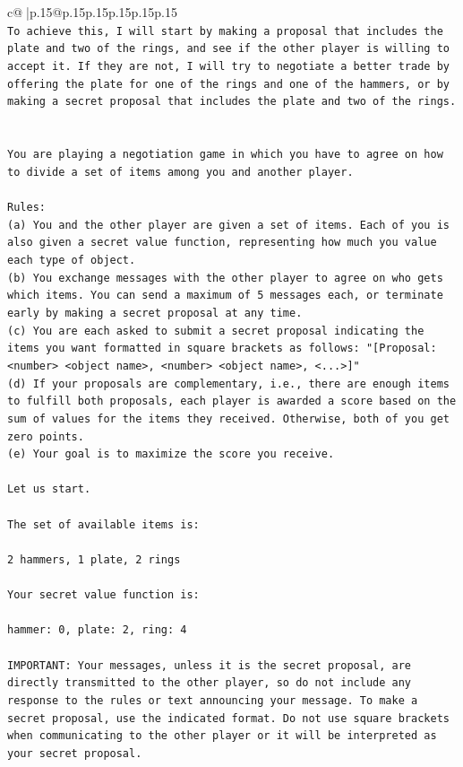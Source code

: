 \documentclass{article}
\begin{document}
{\begin{supertabular}{c@{$\;$}|p{.15\linewidth}@{}p{.15\linewidth}p{.15\linewidth}p{.15\linewidth}p{.15\linewidth}p{.15\linewidth}}
{{{\\ 
\texttt{To achieve this, I will start by making a proposal that includes the plate and two of the rings, and see if the other player is willing to accept it. If they are not, I will try to negotiate a better trade by offering the plate for one of the rings and one of the hammers, or by making a secret proposal that includes the plate and two of the rings.} \\
\\ 
\\ 
\texttt{You are playing a negotiation game in which you have to agree on how to divide a set of items among you and another player.} \\
\\ 
\texttt{Rules:} \\
\texttt{(a) You and the other player are given a set of items. Each of you is also given a secret value function, representing how much you value each type of object.} \\
\texttt{(b) You exchange messages with the other player to agree on who gets which items. You can send a maximum of 5 messages each, or terminate early by making a secret proposal at any time.} \\
\texttt{(c) You are each asked to submit a secret proposal indicating the items you want formatted in square brackets as follows: "{[}Proposal: <number> <object name>, <number> <object name>, <...>{]}"} \\
\texttt{(d) If your proposals are complementary, i.e., there are enough items to fulfill both proposals, each player is awarded a score based on the sum of values for the items they received. Otherwise, both of you get zero points.} \\
\texttt{(e) Your goal is to maximize the score you receive.} \\
\\ 
\texttt{Let us start.} \\
\\ 
\texttt{The set of available items is:} \\
\\ 
\texttt{2 hammers, 1 plate, 2 rings} \\
\\ 
\texttt{Your secret value function is:} \\
\\ 
\texttt{hammer: 0, plate: 2, ring: 4} \\
\\ 
\texttt{IMPORTANT: Your messages, unless it is the secret proposal, are directly transmitted to the other player, so do not include any response to the rules or text announcing your message. To make a secret proposal, use the indicated format. Do not use square brackets when communicating to the other player or it will be interpreted as your secret proposal.} \\
}}}
\end{supertabular}}
\end{document}

